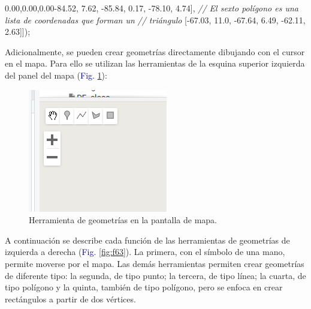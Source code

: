 \documentclass[
  12pt,
  letterpaper,
  twoside]{book}
\newenvironment{Shaded}{\begin{snugshade}}{\end{snugshade}}
\newcommand{\CommentTok}[1]{\textcolor[rgb]{0.24,0.58,0.00}{\textit{#1}}}
\newcommand{\FloatTok}[1]{\textcolor[rgb]{0.28,0.53,0.93}{#1}}
\newcommand{\NormalTok}[1]{#1}
\newcommand{\OperatorTok}[1]{\textcolor[rgb]{0.00,0.00,0.00}{#1}}
\begin{document}
\begin{Shaded}
\begin{Highlighting}[]
\NormalTok{    [}\OperatorTok{{-}}\FloatTok{84.52}\OperatorTok{,} \FloatTok{7.62}\OperatorTok{,}         
     \OperatorTok{{-}}\FloatTok{85.84}\OperatorTok{,} \FloatTok{0.17}\OperatorTok{,}
     \OperatorTok{{-}}\FloatTok{78.10}\OperatorTok{,} \FloatTok{4.74}\NormalTok{]}\OperatorTok{,}
    \CommentTok{// El sexto polígono es una lista de coordenadas que forman un }
    \CommentTok{// triángulo}
\NormalTok{    [}\OperatorTok{{-}}\FloatTok{67.03}\OperatorTok{,} \FloatTok{11.0}\OperatorTok{,}         
     \OperatorTok{{-}}\FloatTok{67.64}\OperatorTok{,} \FloatTok{6.49}\OperatorTok{,}
     \OperatorTok{{-}}\FloatTok{62.11}\OperatorTok{,} \FloatTok{2.63}\NormalTok{]])}\OperatorTok{;}
\end{Highlighting}
\end{Shaded}

Adicionalmente, se pueden crear geometrías directamente dibujando con el cursor en el mapa. Para ello se utilizan las herramientas de la esquina superior izquierda del panel del mapa (\textcolor{darkblue}{Fig.} \ref{fig:f62}):

\begin{figure}[H]

{\centering \includegraphics[width=0.5\linewidth]{Img/geometrias} 

}

\caption{Herramienta de geometrías en la pantalla de mapa.}\label{fig:f62}
\end{figure}

A continuación se describe cada función de las herramientas de geometrías de izquierda a derecha (\textcolor{darkblue}{Fig.} \ref{fig:f63}). La primera, con el símbolo de una mano, permite moverse por el mapa. Las demás herramientas permiten crear geometrías de diferente tipo: la segunda, de tipo punto; la tercera, de tipo línea; la cuarta, de tipo polígono y la quinta, también de tipo polígono, pero se enfoca en crear rectángulos a partir de dos vértices.
\end{document}
